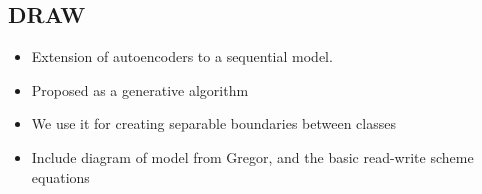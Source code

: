 \subsection{DRAW}\label{sec:draw}

\begin{itemize}
\item Extension of autoencoders to a sequential model. 
\item Proposed as a generative algorithm
\item We use it for creating separable boundaries between classes
\item Include diagram of model from Gregor, and the basic read-write scheme equations 
\end{itemize}